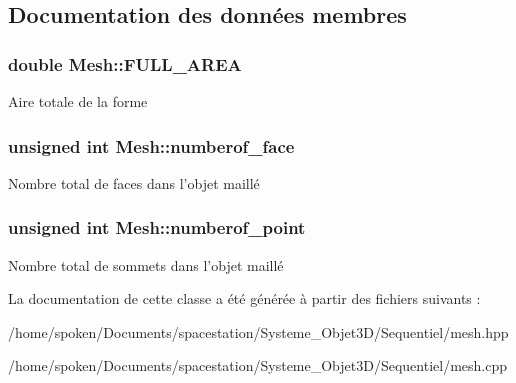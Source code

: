 \subsection{Documentation des données membres}
\hypertarget{class_mesh_a0e1f18abe6ea5a9943e6f8e672f8b037}{
\subsubsection[{F\-U\-L\-L\-\_\-\-A\-R\-E\-A}]{\setlength{\rightskip}{0pt plus 5cm}double Mesh\-::\-F\-U\-L\-L\-\_\-\-A\-R\-E\-A\hspace{0.3cm}{\ttfamily [private]}}}\label{class_mesh_a0e1f18abe6ea5a9943e6f8e672f8b037}
Aire totale de la forme \hypertarget{class_mesh_a8ad7f6788ff772d5e0e17e992571f364}{
\subsubsection[{numberof\-\_\-face}]{\setlength{\rightskip}{0pt plus 5cm}unsigned int Mesh\-::numberof\-\_\-face\hspace{0.3cm}{\ttfamily [private]}}}\label{class_mesh_a8ad7f6788ff772d5e0e17e992571f364}
Nombre total de faces dans l'objet maillé \hypertarget{class_mesh_a9c058bf3f414b6119d7e6ea09703057d}{
\subsubsection[{numberof\-\_\-point}]{\setlength{\rightskip}{0pt plus 5cm}unsigned int Mesh\-::numberof\-\_\-point\hspace{0.3cm}{\ttfamily [private]}}}\label{class_mesh_a9c058bf3f414b6119d7e6ea09703057d}
Nombre total de sommets dans l'objet maillé 

La documentation de cette classe a été générée à partir des fichiers suivants \-:\begin{DoxyCompactItemize}
\item 
/home/spoken/\-Documents/spacestation/\-Systeme\-\_\-\-Objet3\-D/\-Sequentiel/mesh.\-hpp\item 
/home/spoken/\-Documents/spacestation/\-Systeme\-\_\-\-Objet3\-D/\-Sequentiel/mesh.\-cpp\end{DoxyCompactItemize}
